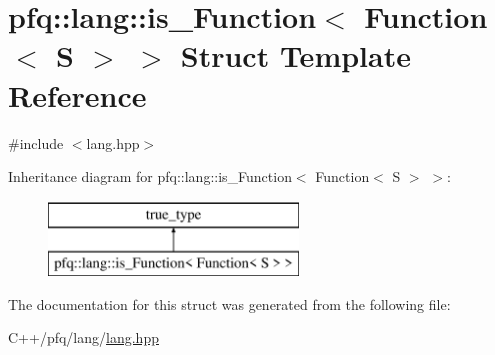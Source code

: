 \hypertarget{structpfq_1_1lang_1_1is__Function_3_01Function_3_01S_01_4_01_4}{\section{pfq\+:\+:lang\+:\+:is\+\_\+\+Function$<$ Function$<$ S $>$ $>$ Struct Template Reference}
\label{structpfq_1_1lang_1_1is__Function_3_01Function_3_01S_01_4_01_4}
}


{\ttfamily \#include $<$lang.\+hpp$>$}

Inheritance diagram for pfq\+:\+:lang\+:\+:is\+\_\+\+Function$<$ Function$<$ S $>$ $>$\+:\begin{figure}[H]
\begin{center}
\leavevmode
\includegraphics[height=2.000000cm]{structpfq_1_1lang_1_1is__Function_3_01Function_3_01S_01_4_01_4}
\end{center}
\end{figure}


The documentation for this struct was generated from the following file\+:\begin{DoxyCompactItemize}
\item 
C++/pfq/lang/\hyperlink{lang_8hpp}{lang.\+hpp}\end{DoxyCompactItemize}
